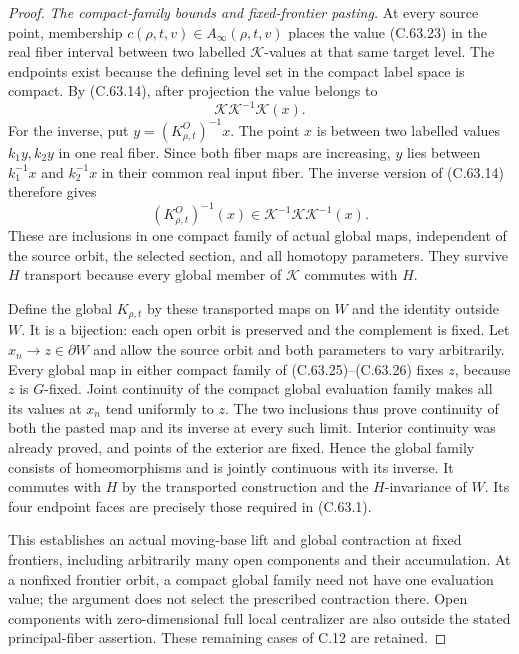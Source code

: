 \begin{proof}
\emph{The compact-family bounds and fixed-frontier pasting.}
At every source point, membership
$c(\rho,t,v)\in A_\infty(\rho,t,v)$ places
the value (C.63.23) in the real fiber interval
between two labelled $\mathcal K$-values at
that same target level. The endpoints exist
because the defining level set in the compact
label space is compact. By (C.63.14), after
projection the value belongs to
\[
                   \mathcal K\mathcal K^{-1}\mathcal K(x).
                                                               \tag{C.63.25}
\]
For the inverse, put $y=(K_{\rho,t}^O)^{-1}x$.
The point $x$ is between two labelled values
$k_1y,k_2y$ in one real fiber. Since both
fiber maps are increasing, $y$ lies between
$k_1^{-1}x$ and $k_2^{-1}x$ in their common
real input fiber. The inverse version of
(C.63.14) therefore gives
\[
        (K_{\rho,t}^O)^{-1}(x)
             \in\mathcal K^{-1}\mathcal K\mathcal K^{-1}(x).
                                                               \tag{C.63.26}
\]
These are inclusions in one compact family
of actual global maps, independent of the
source orbit, the selected section, and all
homotopy parameters. They survive $H$
transport because every global member of
$\mathcal K$ commutes with $H$.

Define the global $K_{\rho,t}$ by these
transported maps on $W$ and the identity
outside $W$. It is a bijection: each open
orbit is preserved and the complement is
fixed. Let $x_n\to z\in\partial W$ and
allow the source orbit and both parameters
to vary arbitrarily. Every global map in
either compact family of (C.63.25)--(C.63.26)
fixes $z$, because $z$ is $G$-fixed.
Joint continuity of the compact global
evaluation family makes all its values at
$x_n$ tend uniformly to $z$.
The two inclusions thus prove continuity
of both the pasted map and its inverse at
every such limit. Interior continuity was
already proved, and points of the exterior
are fixed. Hence the global family consists
of homeomorphisms and is jointly continuous
with its inverse. It commutes with $H$ by
the transported construction and the
$H$-invariance of $W$. Its four endpoint
faces are precisely those required in
(C.63.1).

This establishes an actual moving-base lift
and global contraction at fixed frontiers,
including arbitrarily many open components
and their accumulation. At a nonfixed
frontier orbit, a compact global family need
not have one evaluation value; the argument
does not select the prescribed contraction
there. Open components with zero-dimensional
full local centralizer are also outside the
stated principal-fiber assertion. These
remaining cases of C.12 are retained.
\end{proof}
